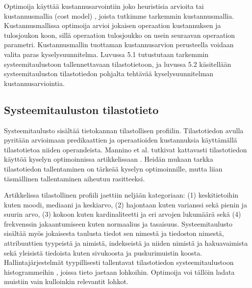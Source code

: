 \documentclass[finnish]{tktltiki2}
\theoremstyle{definition}
\theoremstyle{remark}
\begin{document}
Optimoija käyttää kustannusarvointiin joko heuristisia arvioita tai kustannusmallia (cost model) \cite{jarke1984}, joista tutkimme tarkemmin kustannusmallia. Kustannusmallissa optimoija arvioi jokaisen operaation kustannuksen ja tulosjoukon koon, sillä operaation tulosjoukko on usein seuraavan operaation parametri. Kustannusmallin tuottaman kustannusarvion perusteella voidaan valita paras kyselysuunnitelma. Luvussa 5.1 tutustutaan tarkemmin systeemitaulustoon tallennettavaan tilastotietoon, ja luvussa 5.2 käsitellään systeemitauluston tilastotiedon pohjalta tehtävää kyselysuunnitelman kustannusarviointia.


\subsection{Systeemitauluston tilastotieto}
Systeemitaulusto sisältää tietokannan tilastollisen profiilin. Tilastotiedon avulla pyritään arvioimaan predikaattien ja operaatioiden kustannuksia käyttämällä tilastotietoa niiden operandeista. Mannino et al. tutkivat kattavasti tilastotiedon käyttöä kyselyn optimoinnissa artikkelissaan \cite{mannino1988statistical}. Heidän mukaan tarkka tilastotiedon tallentaminen on tärkeää kyselyn optimoinnille, mutta liian täsmällinen tallentaminen aiheutuu rasitteeksi.

Artikkelissa tilastollinen profiili jaettiin neljään kategoriaan: (1) keskitietoihin kuten moodi, mediaani ja keskiarvo,  (2) hajontaan kuten varianssi sekä pienin ja suurin arvo, (3) kokoon kuten kardinaliteetti ja eri arvojen lukumäärä sekä (4) frekvenssin jakaantumiseen kuten normaalius ja tasaisuus. Systeemitaulusto sisältää myös jokaisesta taulusta tiedot sen nimestä ja tiedoston nimestä,  attribuuttien tyypeistä ja nimistä, indekseistä ja niiden nimistä ja hakuavaimista sekä yleisistä tiedoista kuten sivukoosta ja puskurimuistin koosta. Hallintajärjestelmät tyypillisesti tallentavat tilastotiedon systeemitaulustoon histogrammeihin \cite{chaudhuri1998}, joissa tieto jaetaan lohkoihin. Optimoija voi tällöin ladata muistiin vain kulloinkin relevantit lohkot. %
\end{document}
